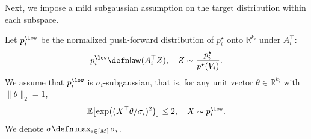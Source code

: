 Next, we impose a mild subgaussian assumption on the target distribution within each subspace.
%
\begin{assumption}
    \label{assump:sub-gaussian target}
    Let $p_i^\low$ be the normalized push-forward distribution of $p_i^\star$ onto $\mathbb{R}^{k_i}$ under $A_i^{\top}$: 
    \begin{align}
        p_i^\low \defn \mathsf{law}(A_i^{\top}Z), \quad Z \sim \frac{p_i^\star}{p^\star(V_i)}. \label{eq:dist in each low-dim}
    \end{align}
    We assume that $p_i^\low$ is $\sigma_i$-subgaussian, that is, for any unit vector $\theta \in \mathbb{R}^{k_i}$ with $\|\theta\|_2 = 1$,
    \begin{align*}
        \mathbb{E} \bigl[\exp\bigl( (X^{\top}\theta/\sigma_i)^2\bigr)\bigr] \leq 2, \quad X \sim p_i^\low.
    \end{align*}
    We denote $\sigma \defn \max_{i\in [M]} \sigma_i$.
\end{assumption}

